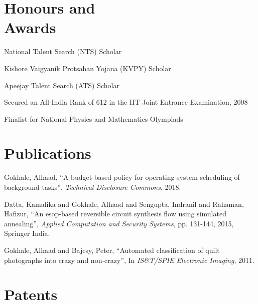 \documentclass[margin,line]{resume}
\begin{document}
\begin{resume}
    \section{\mysidestyle Honours and\\Awards} 

    \begin{list2}
        \item National Talent Search (NTS) Scholar
        \item Kishore Vaigyanik Protsahan Yojana (KVPY) Scholar
        \item Apeejay Talent Search (ATS) Scholar
        \item Secured an All-India Rank of 612 in the IIT Joint Entrance Examination, 2008
        \item Finalist for National Physics and Mathematics Olympiads
    \end{list2}\vspace{-1.5mm}


    \section{\mysidestyle Publications}

    Gokhale, Alhaad, ``A budget-based policy for operating system scheduling of background tasks'',
    \textsl{Technical Disclosure Commons}, 2018.

\vspace{-2mm}
    Datta, Kamalika and Gokhale, Alhaad and Sengupta, Indranil and Rahaman, Hafizur, 
    ``An esop-based reversible circuit synthesis flow using simulated annealing'',
    \textsl{Applied Computation and Security Systems}, pp. 131-144, 2015, Springer India.

\vspace{-2mm}
    Gokhale, Alhaad and Bajcsy, Peter,
    ``Automated classification of quilt photographs into crazy and non-crazy'',
    In \textsl{IS\&T/SPIE Electronic Imaging}, 2011.
    
    \section{\mysidestyle Patents}


\end{resume}
\end{document}
